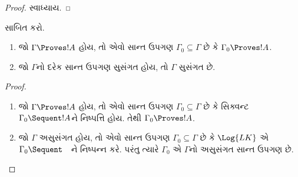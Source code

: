 \begin{proof}
સ્વાધ્યાય.
\end{proof}

\begin{prob}
 સાબિત કરો.
\end{prob}

\begin{prop}[સઘનતા]
  \begin{enumerate}
  \item જો $\Gamma \Proves !A$ હોય, તો
    એવો સાન્ત ઉપગણ $\Gamma_0
    \subseteq \Gamma$ છે કે
    $\Gamma_0 \Proves !A$.
  \item જો $\Gamma$નો દરેક
    સાન્ત ઉપગણ સુસંગત હોય,
    તો $\Gamma$ સુસંગત છે.
  \end{enumerate}
\end{prop}

\begin{proof}
  \begin{enumerate}
    \item જો $\Gamma \Proves !A$ હોય,
      તો એવો સાન્ત ઉપગણ
      $\Gamma_0 \subseteq \Gamma$ છે કે
      સિક્વન્ટ $\Gamma_0
      \Sequent !A$ને
      નિષ્પત્તિ હોય. તેથી
      $\Gamma_0 \Proves !A$.
    \item જો $\Gamma$ અસુસંગત હોય,
      તો એવો સાન્ત ઉપગણ
      $\Gamma_0 \subseteq \Gamma$ છે કે
      $\Log{LK}$ એ $\Gamma_0
      \Sequent \quad$ને
      નિષ્પન્ન કરે. પરંતુ
      ત્યારે $\Gamma_0$ એ
      $\Gamma$નો અસુસંગત
      સાન્ત ઉપગણ છે.
  \end{enumerate}
\end{proof}
\endgroup
\endgroup


\OLEndPartHook
